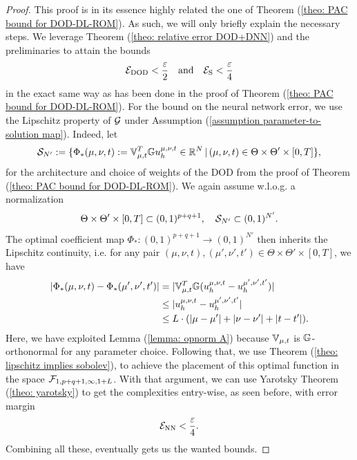 \begin{proof}
    This proof is in its essence highly related the one of Theorem (\ref{theo: PAC bound for DOD-DL-ROM}).
    As such, we will only briefly explain the necessary steps.
    We leverage Theorem (\ref{theo: relative error DOD+DNN}) and the preliminaries to attain the bounds
    \begin{equation*}
        \mathcal{E}_\text{DOD} < \frac{\varepsilon}{2} \quad \text{and} \quad \mathcal{E}_\text{S} < \frac{\varepsilon}{4}
    \end{equation*}
    in the exact same way as has been done in the proof of Theorem (\ref{theo: PAC bound for DOD-DL-ROM}). 
    For the bound on the neural network error, we use the Lipschitz property of $\mathcal{G}$ under 
    Assumption (\ref{assumption parameter-to-solution map}). 
    Indeed, let 
    \begin{equation*}
        \mathcal{S}_{N'} :=  \{\Phi_*(\mu, \nu, t) := \mathbb{V}_{\mu, t}^T \mathbb{G} u_h^{\mu, \nu, t} \in \mathbb{R}^N \, \vert \, (\mu, \nu, t) 
        \in \Theta \times \Theta' \times [0, T] \},
    \end{equation*}
    for the architecture and choice of weights of the DOD 
    from the proof of Theorem (\ref{theo: PAC bound for DOD-DL-ROM}). 
    We again assume w.l.o.g. a normalization
    \begin{equation*}
        \Theta \times \Theta' \times [0, T] \subset (0, 1)^{p+q+1}, \quad \mathcal{S}_{N'} \subset (0, 1)^{N'}.
    \end{equation*}
    The optimal coefficient map
    $\Phi_*: (0, 1)^{p+q+1} \to (0, 1)^{N'}$ 
    then inherits the Lipschitz continuity, i.e. for any pair $(\mu, \nu, t), (\mu', \nu', t') 
    \in \Theta \times \Theta' \times [0, T]$, we have
    \begin{align*}
        \lvert \Phi_*(\mu, \nu, t) - \Phi_*(\mu', \nu', t') \rvert &= \lvert \mathbb{V}_{\mu, t}^T \mathbb{G} (u_h^{\mu, \nu, t} - u_h^{\mu', \nu', t'}) \rvert
        \\
        &\leq \lvert u_h^{\mu, \nu, t} - u_h^{\mu', \nu', t'} \rvert \\
        &\leq L \cdot (\lvert \mu - \mu' \rvert + \lvert \nu - \nu' \rvert + 
        \lvert t - t' \rvert).
    \end{align*}
    Here, we have exploited Lemma (\ref{lemma: opnorm A}) because $\mathbb{V}_{\mu, t}$ is $\mathbb{G}$-orthonormal
    for any parameter choice.
    Following that, we use Theorem (\ref{theo: lipschitz implies sobolev}), to achieve the placement
    of this optimal function in the space $\mathcal{F}_{1, p+q+1, \infty, 1 + L}$. With that argument, we can 
    use Yarotsky Theorem (\ref{theo: yarotsky}) to get the complexities entry-wise, as seen before,
    with error margin
    \begin{equation*}
        \mathcal{E}_\text{NN} < \frac{\varepsilon}{4}.
    \end{equation*}
    Combining all these, eventually gets us the wanted bounds.
\end{proof}





